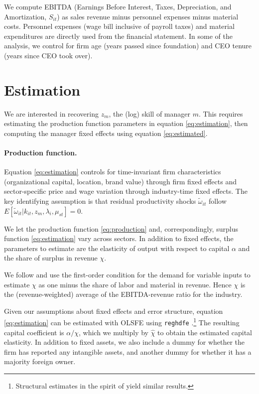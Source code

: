 \documentclass[11pt,a4paper]{article}
\begin{document}
We compute EBITDA (Earnings Before Interest, Taxes, Depreciation, and Amortization, $S_{it}$) as sales revenue minus personnel expenses minus material costs. Personnel expenses (wage bill inclusive of payroll taxes) and material expenditures are directly used from the financial statement. In some of the analysis, we control for firm age (years passed since foundation) and CEO tenure (years since CEO took over).

\section{Estimation}

We are interested in recovering $z_m$, the (log) skill of manager $m$. This requires estimating the production function parameters in equation \eqref{eq:estimation}, then computing the manager fixed effects using equation \eqref{eq:estimated}.

\paragraph{Production function.}
Equation \eqref{eq:estimation} controls for time-invariant firm characteristics (organizational capital, location, brand value) through firm fixed effects and sector-specific price and wage variation through industry-time fixed effects. The key identifying assumption is that residual productivity shocks $\tilde{\omega}_{it}$ follow $E[\tilde\omega_{it} | k_{it}, z_m, \lambda_i, \mu_{st}]=0$.

We let the production function \eqref{eq:production} and, correspondingly, surplus function \eqref{eq:estimation} vary across sectors. In addition to fixed effects, the parameters to estimate are the elasticity of output with respect to capital $\alpha$ and the share of surplus in revenue $\chi$. 

We follow \citet{Gandhi2020-nu} and use the first-order condition for the demand for variable inputs to estimate $\chi$ as one minus the share of labor and material in revenue. Hence $\chi$ is the (revenue-weighted) average of the EBITDA-revenue ratio for the industry.

Given our assumptions about fixed effects and error structure, equation \eqref{eq:estimation} can be estimated with OLSFE using \texttt{reghdfe} \citep{reghdfe}.\footnote{Structural estimates in the spirit of \citet{Olley1996-wy} yield similar results.} The resulting capital coefficient is $\alpha/\chi$, which we multiply by $\hat\chi$ to obtain the estimated capital elasticity. In addition to fixed assets, we also include a dummy for whether the firm has reported any intangible assets, and another dummy for whether it has a majority foreign owner.
\end{document}
